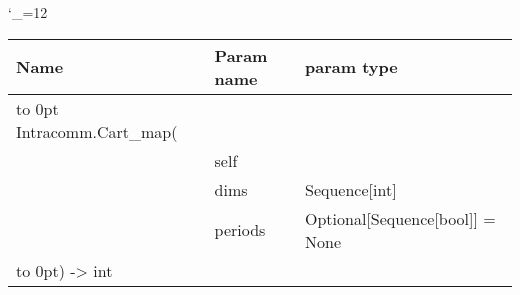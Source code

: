 \begingroup \catcode`\_=12 \tt
\begin{tabular}{lll}
\toprule
\textrm{Name}&\textrm{Param name}&\textrm{param type}\\
\midrule
\hbox to 0pt {Intracomm.Cart_map(\hss}\\
& self\\
& dims & Sequence[int]\\
& periods & Optional[Sequence[bool]] = None\\
\hbox to 0pt{) -> int\hss}\\
\bottomrule
\end{tabular}
\endgroup
